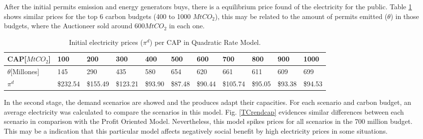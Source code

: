 \documentclass[a4paper,fleqn]{cas-dc}
\begin{document}
After the initial permits emission and energy generators buys, there is a equilibrium price found of the electricity for the public. Table \ref{TCpidporcap} shows similar prices for the top 6 carbon budgets (400 to 1000 $MtCO_2$), this may be related to the amount of permits emitted ($\theta$) in those budgets, where the Auctioneer sold around $600 MtCO_2$ in each one. 

\begin{table}[b]
\caption{{\footnotesize Initial electricity prices ($\pi^d$) per CAP in Quadratic Rate Model.}}
    \label{TCpidporcap}
\begin{footnotesize}
    \centering
    \begin{tabular}{ l l l l l l l l l l l }
    \hline
        CAP[$MtCO_2$] & 100 & 200 & 300 & 400 & 500 & 600 & 700 & 800 & 900 & 1000 \\ \hline
       $\theta$[Millones]  & 145  & 290  & 435  & 580  & 654  & 620  & 661  & 611  & 609  & 699  \\ \hline
        $\pi^d$  &  \$232.54   &  \$155.49   &  \$123.21   &  \$93.90   &  \$87.48   &  \$90.44   &  \$105.74   &  \$95.05   &  \$93.38   &  \$94.53   \\ \hline
    \end{tabular}
\end{footnotesize}
\end{table}

In the second stage, the demand scenarios are showed and the produces adapt their capacities. For each scenario and carbon budget, an average electricity was calculated to compare the scenarios in this model. Fig. \ref{TCrendcap} evidences similar differences between each scenario in comparison with the Profit Oriented Model. Nevertheless, this model spikes prices for all scenarios in the 700 million budget. This may be a indication that this particular model affects negatively social benefit by high electricity prices in some situations.
\end{document}
